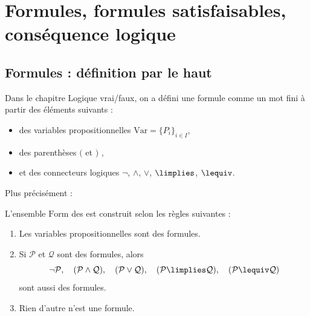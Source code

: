 \documentclass[11pt,class=report,crop=false]{standalone}
\begin{document}







\bigskip



\section{Formules, formules satisfaisables, conséquence logique}

\subsection{Formules : définition par le haut}

Dans le chapitre \og{}Logique vrai/faux\fg{}, on a défini une formule comme un mot fini à partir des éléments suivants :
	\begin{itemize}
		\item des variables propositionnelles $\text{Var} = \{ P_i \}_{i\in I}$,
		
		\item des parenthèses $($ et $)$\; ,
		
		\item et des connecteurs logiques $\lnot$, $\land$, $\lor$, $\limplies$, $\lequiv$.
	\end{itemize}


Plus précisément :
\begin{definition}
	L'ensemble $\text{Form}$ des  est construit selon les règles suivantes :
	\begin{enumerate}
		\item Les variables propositionnelles sont des formules.
		
		\item Si $\mathcal{P}$ et $\mathcal{Q}$ sont des formules, alors 
\[
\lnot \mathcal{P}, \quad
(\mathcal{P} \land \mathcal{Q}), \quad
(\mathcal{P} \lor \mathcal{Q}) , \quad
(\mathcal{P} \limplies \mathcal{Q}), \quad
(\mathcal{P} \lequiv \mathcal{Q})
\] 		
sont aussi des formules.
	
		\item Rien d'autre n'est une formule.
	\end{enumerate}
\end{definition}	
	
\end{document}
